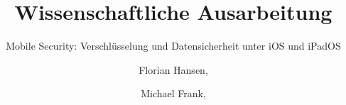 \documentclass{hsflensburg}
\title{Wissenschaftliche Ausarbeitung}
\subtitle{Mobile Security: Verschlüsselung und Datensicherheit unter iOS und iPadOS}
\author{
	Florian Hansen,
	\and
	Michael Frank,
}
\begin{document}
	\maketitle
  \tableofcontents

  \pagebreak

	\clearpage
	
	
\end{document}
